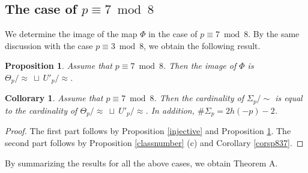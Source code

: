 \documentclass[10pt,a4paper]{amsart}
\theoremstyle{plain}
\newtheorem{prop}[defn]{Proposition}
\newtheorem{cor}[defn]{Collorary}
\begin{document}
\subsection{The case of $p \equiv 7 \bmod 8$}
We determine the image of the map $\Phi$ in the case of $p \equiv 7 \bmod 8$. By the same discussion with the case $p \equiv 3 \bmod 8$, we obtain the following result.
\begin{prop}
\label{sur7}
Assume that $p \equiv 7 \bmod 8 $. Then the image of $\Phi$ is ${\Theta}_{p}/\approx \ \sqcup \ U'_p/\approx$. 
\end{prop}

\begin{cor}
\label{number7}
    Assume that $p \equiv 7 \bmod 8$. Then the cardinality of 
    ${\Sigma}_p /\sim$ is equal to the cardinality of ${\Theta}_{p} /\approx \ \sqcup \ U'_p / \approx$. In addition, $\# {\Sigma}_p=2h(-p)-2$.
\end{cor}
\begin{proof}
    The first part follows by Proposition \ref{injective} and Proposition \ref{sur7}. The second part follows by Proposition \ref{classnumber} (c) and Corollary \ref{corsp837}.
\end{proof}

By summarizing the results for all the above cases, we obtain Theorem A.
\end{document}
